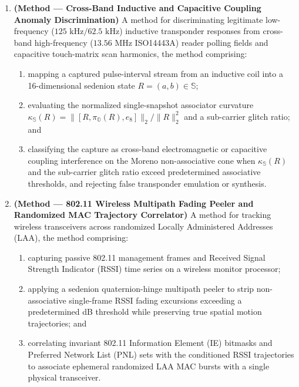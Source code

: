 \documentclass[12pt,letterpaper]{article}
\begin{document}
\begin{enumerate}[leftmargin=20pt,itemsep=4pt]
    \item \textbf{(Method --- Cross-Band Inductive and Capacitive Coupling Anomaly Discrimination)} A method for discriminating legitimate low-frequency ($125\text{ kHz} / 62.5\text{ kHz}$) inductive transponder responses from cross-band high-frequency ($13.56\text{ MHz}$ ISO14443A) reader polling fields and capacitive touch-matrix scan harmonics, the method comprising:
    \begin{enumerate}[leftmargin=16pt,itemsep=1pt]
        \item mapping a captured pulse-interval stream from an inductive coil into a 16-dimensional sedenion state $R = (a, b) \in \mathbb{S}$;
        \item evaluating the normalized single-snapshot associator curvature $\kappa_{\mathbb{S}}(R) = \|[R, \pi_{\mathbb{O}}(R), e_8]\|_2 / \|R\|_2^2$ and a sub-carrier glitch ratio; and
        \item classifying the capture as cross-band electromagnetic or capacitive coupling interference on the Moreno non-associative cone when $\kappa_{\mathbb{S}}(R)$ and the sub-carrier glitch ratio exceed predetermined associative thresholds, and rejecting false transponder emulation or synthesis.
    \end{enumerate}

    \item \textbf{(Method --- 802.11 Wireless Multipath Fading Peeler and Randomized MAC Trajectory Correlator)} A method for tracking wireless transceivers across randomized Locally Administered Addresses (LAA), the method comprising:
    \begin{enumerate}[leftmargin=16pt,itemsep=1pt]
        \item capturing passive 802.11 management frames and Received Signal Strength Indicator (RSSI) time series on a wireless monitor processor;
        \item applying a sedenion quaternion-hinge multipath peeler to strip non-associative single-frame RSSI fading excursions exceeding a predetermined dB threshold while preserving true spatial motion trajectories; and
        \item correlating invariant 802.11 Information Element (IE) bitmasks and Preferred Network List (PNL) sets with the conditioned RSSI trajectories to associate ephemeral randomized LAA MAC bursts with a single physical transceiver.
    \end{enumerate}


\end{enumerate}
\end{document}
